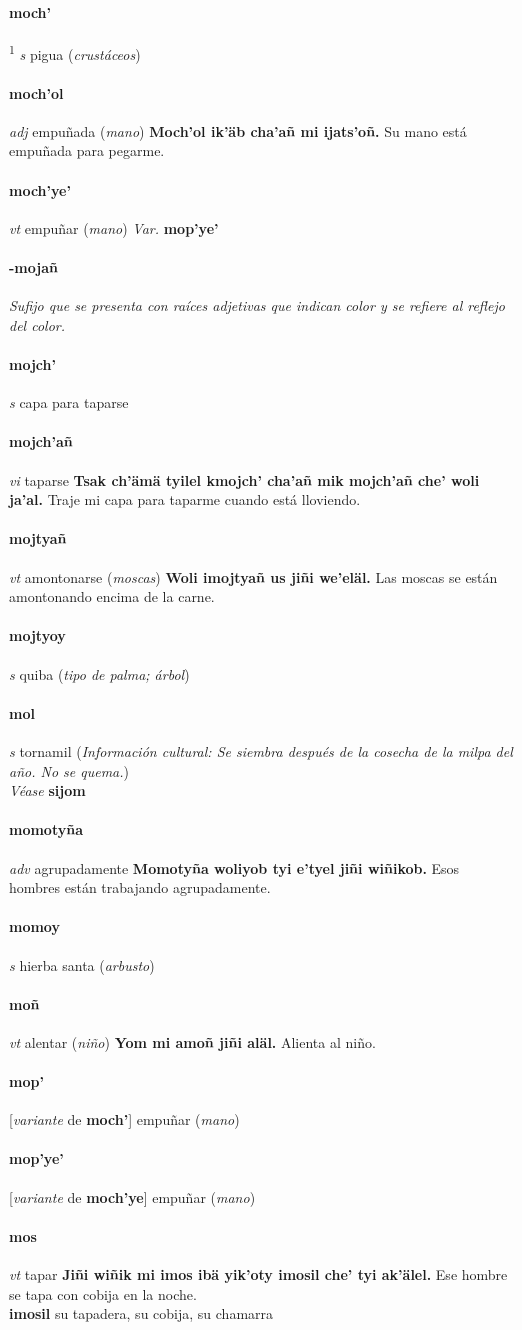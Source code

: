 \documentclass{scrbook}
\newcommand{\entry}[1]{\paragraph{#1}}
\newcommand{\defsuperscript}[1]{\textsuperscript{1}}
\newcommand{\nontranslationdef}[1]{\textit{#1}}
\newcommand{\partofspeech}[1]{\textit{#1}}
\newcommand{\spanishtranslation}[1]{#1}
\newcommand{\clarification}[1]{(\textit{#1})}
\newcommand{\cholexample}[1]{\textbf{#1}}
\newcommand{\exampletranslation}[1]{#1}
\newcommand{\alsosee}[1]{\\\textit{Véase} \textbf{#1}}
\newcommand{\culturalinformation}[1]{(\textit{#1})}
\newcommand{\secondaryentry}[1]{\\\textbf{#1}}
\newcommand{\secondtranslation}[1]{#1}
\newcommand{\variation}[1]{\textit{Var.} \textbf{#1}}
\newcommand{\conjugationtense}[1]{[\textit{#1}}
\newcommand{\conjugationverb}[1]{de \textbf{#1}]}
\begin{document}
\begin{multicols}{2}
\entry{moch'}
\defsuperscript{2}
\partofspeech{s}
\spanishtranslation{pigua}
\clarification{crustáceos}

\entry{moch'ol}
\partofspeech{adj}
\spanishtranslation{empuñada}
\clarification{mano}
\cholexample{Moch'ol ik'äb cha'añ mi ijats'oñ.}
\exampletranslation{Su mano está empuñada para pegarme.}

\entry{moch'ye'}
\partofspeech{vt}
\spanishtranslation{empuñar}
\clarification{mano}
\variation{mop'ye'}

\entry{-mojañ}
\nontranslationdef{Sufijo que se presenta con raíces adjetivas que indican color y se refiere al reflejo del color.}

\entry{mojch'}
\partofspeech{s}
\spanishtranslation{capa para taparse}

\entry{mojch'añ}
\partofspeech{vi}
\spanishtranslation{taparse}
\cholexample{Tsak ch'ämä tyilel kmojch' cha'añ mik mojch'añ che' woli ja'al.}
\exampletranslation{Traje mi capa para taparme cuando está lloviendo.}

\entry{mojtyañ}
\partofspeech{vt}
\spanishtranslation{amontonarse}
\clarification{moscas}
\cholexample{Woli imojtyañ us jiñi we'eläl.}
\exampletranslation{Las moscas se están amontonando encima de la carne.}

\entry{mojtyoy}
\partofspeech{s}
\spanishtranslation{quiba}
\clarification{tipo de palma; árbol}

\entry{mol}
\partofspeech{s}
\spanishtranslation{tornamil}
\culturalinformation{Información cultural: Se siembra después de la cosecha de la milpa del año. No se quema.}
\alsosee{sijom}

\entry{momotyña}
\partofspeech{adv}
\spanishtranslation{agrupadamente}
\cholexample{Momotyña woliyob tyi e'tyel jiñi wiñikob.}
\exampletranslation{Esos hombres están trabajando agrupadamente.}

\entry{momoy}
\partofspeech{s}
\spanishtranslation{hierba santa}
\clarification{arbusto}

\entry{moñ}
\partofspeech{vt}
\spanishtranslation{alentar}
\clarification{niño}
\cholexample{Yom mi amoñ jiñi aläl.}
\exampletranslation{Alienta al niño.}

\entry{mop'}
\conjugationtense{variante}
\conjugationverb{moch'}
\spanishtranslation{empuñar}
\clarification{mano}

\entry{mop'ye'}
\conjugationtense{variante}
\conjugationverb{moch'ye}
\spanishtranslation{empuñar}
\clarification{mano}

\entry{mos}
\partofspeech{vt}
\spanishtranslation{tapar}
\cholexample{Jiñi wiñik mi imos ibä yik'oty imosil che' tyi ak'älel.}
\exampletranslation{Ese hombre se tapa con cobija en la noche.}
\secondaryentry{imosil}
\secondtranslation{su tapadera, su cobija, su chamarra}


\end{multicols}
\end{document}
